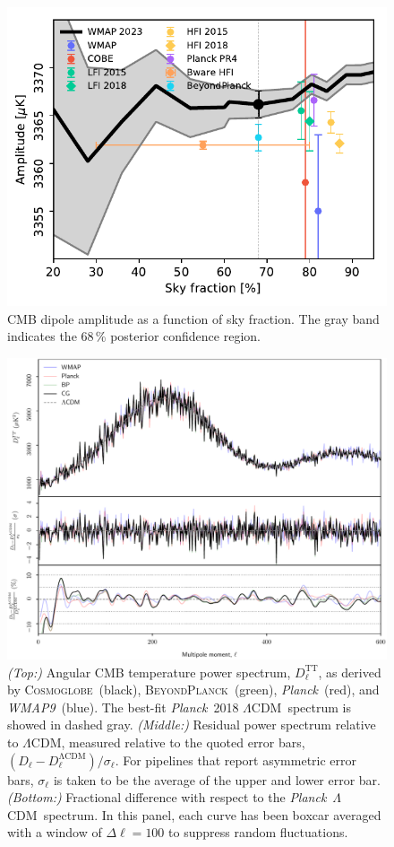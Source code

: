 \documentclass[twocolumn]{../../common/aa}
\def\WMAPnine{\emph{WMAP9}}
\def\planck{\emph{Planck}}
\def\LCDM{$\Lambda$CDM}
\newcommand{\bp}{\textsc{BeyondPlanck}}
\newcommand{\cosmoglobe}{\textsc{Cosmoglobe}}
\begin{document}
\begin{figure}
	\includegraphics[width=\columnwidth]{figures/dip_amplitude.pdf}
	\caption{CMB dipole amplitude as a function of sky fraction. The gray band indicates the 68\,\% posterior confidence region.}
	\label{fig:dip_amp}
\end{figure}

\begin{figure}
	\includegraphics[width=\textwidth]{figures/cl_TT_CG_v1.pdf}
	\caption{\textit{(Top:)} Angular CMB temperature power spectrum, $D_\ell^\mathrm{TT}$, as derived by \cosmoglobe\ (black), \bp\ (green), \planck\ (red), and \WMAPnine\ (blue). The best-fit \planck\ 2018 \LCDM\ spectrum is showed in dashed gray. \textit{(Middle:)} Residual power spectrum relative to \LCDM, measured relative to the quoted error bars, $(D_\ell-D_\ell^\mathrm{\Lambda CDM})/\sigma_\ell$. For pipelines that report asymmetric error bars, $\sigma_\ell$ is taken to be the average of the upper and lower error bar. \textit{(Bottom:)} Fractional difference with respect to the \planck\ \LCDM\ spectrum. In this panel, each curve has been boxcar averaged with a window of $\Delta\ell=100$ to suppress random fluctuations.}
	\label{fig:cl_tt}
\end{figure}
\end{document}
